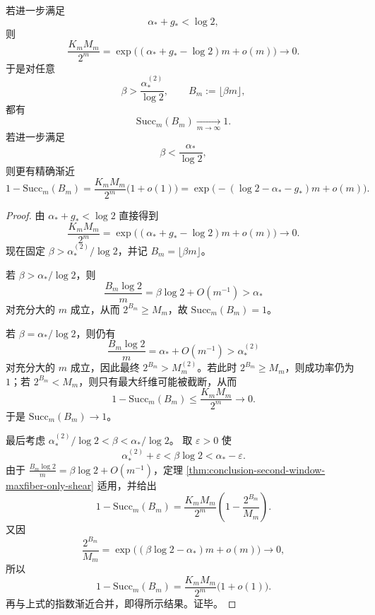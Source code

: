 \begin{corollary}[指数稀薄最大层下的几乎全恢复阈值下移]\label{cor:conclusion-ae-recovery-threshold-drops-to-second-maximum}
若进一步满足
\[
\alpha_\ast+g_\ast<\log 2,
\]
则
\[
\frac{K_mM_m}{2^m}
=
\exp\!\bigl((\alpha_\ast+g_\ast-\log 2)m+o(m)\bigr)\to 0.
\]
于是对任意
\[
\beta>\frac{\alpha_\ast^{(2)}}{\log 2},
\qquad
B_m:=\lfloor \beta m\rfloor,
\]
都有
\[
\mathrm{Succ}_m(B_m)\xrightarrow[m\to\infty]{}1.
\]
若进一步满足
\[
\beta<\frac{\alpha_\ast}{\log 2},
\]
则更有精确渐近
\[
1-\mathrm{Succ}_m(B_m)
=
\frac{K_mM_m}{2^m}\bigl(1+o(1)\bigr)
=
\exp\!\bigl(-(\log 2-\alpha_\ast-g_\ast)m+o(m)\bigr).
\]
\end{corollary}
\begin{proof}
由 \(\alpha_\ast+g_\ast<\log 2\) 直接得到
\[
\frac{K_mM_m}{2^m}
=
\exp\!\bigl((\alpha_\ast+g_\ast-\log 2)m+o(m)\bigr)\to 0.
\]
现在固定 \(\beta>\alpha_\ast^{(2)}/\log 2\)，并记 \(B_m=\lfloor \beta m\rfloor\)。

若 \(\beta>\alpha_\ast/\log 2\)，则
\[
\frac{B_m\log 2}{m}=\beta\log 2+O(m^{-1})>\alpha_\ast
\]
对充分大的 \(m\) 成立，从而 \(2^{B_m}\ge M_m\)，故 \(\mathrm{Succ}_m(B_m)=1\)。

若 \(\beta=\alpha_\ast/\log 2\)，则仍有
\[
\frac{B_m\log 2}{m}=\alpha_\ast+O(m^{-1})>\alpha_\ast^{(2)}
\]
对充分大的 \(m\) 成立，因此最终 \(2^{B_m}>M_m^{(2)}\)。若此时 \(2^{B_m}\ge M_m\)，则成功率仍为 \(1\)；若 \(2^{B_m}<M_m\)，则只有最大纤维可能被截断，从而
\[
1-\mathrm{Succ}_m(B_m)\le \frac{K_mM_m}{2^m}\to 0.
\]
于是 \(\mathrm{Succ}_m(B_m)\to 1\)。

最后考虑
\(
\alpha_\ast^{(2)}/\log 2<\beta<\alpha_\ast/\log 2
\)。
取 \(\varepsilon>0\) 使
\[
\alpha_\ast^{(2)}+\varepsilon<\beta\log 2<\alpha_\ast-\varepsilon.
\]
由于 \(\frac{B_m\log 2}{m}=\beta\log 2+O(m^{-1})\)，定理
\ref{thm:conclusion-second-window-maxfiber-only-shear}
适用，并给出
\[
1-\mathrm{Succ}_m(B_m)
=
\frac{K_mM_m}{2^m}\left(1-\frac{2^{B_m}}{M_m}\right).
\]
又因
\[
\frac{2^{B_m}}{M_m}
=
\exp\!\bigl((\beta\log 2-\alpha_\ast)m+o(m)\bigr)\to 0,
\]
所以
\[
1-\mathrm{Succ}_m(B_m)
=
\frac{K_mM_m}{2^m}\bigl(1+o(1)\bigr).
\]
再与上式的指数渐近合并，即得所示结果。证毕。
\end{proof}

